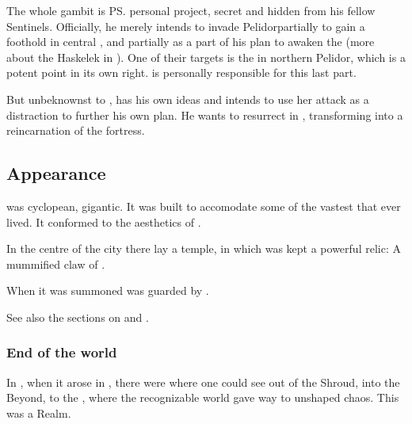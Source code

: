 The whole \Nithdornazsh{} gambit is \ps{\HriistD}{} personal project, secret and hidden from his fellow Sentinels. 
Officially, he merely intends to invade Pelidor\dash partially to gain a foothold in central \Velcad{}, and partially as a part of his plan to awaken the \Haskelek{} (more about the Haskelek in \CarzainWithRedcorBook). 
One of their targets is the  in northern Pelidor, which is a potent \nexus{} point in its own right. 
\Nzessuacrith{} is personally responsible for this last part. 

But unbeknownst to \Nzessuacrith, \HriistD{} has his own ideas and intends to use her attack as a distraction to further his own plan. He wants to resurrect \Nithdornazsh{} in \Malcur, transforming \Malcur into a reincarnation of the \draconic{} fortress. 









\subsection{Appearance}
\Nithdornazsh{} was cyclopean, gigantic. 
It was built to accomodate some of the vastest \dragons{} that ever lived. 
It conformed to the aesthetics of . 

In the centre of the city there lay a temple, in which was kept a powerful relic: 
A mummified claw of \TyarithXserasshana. 

When it was summoned \Nithdornazsh{} was guarded by . 

See also the sections on  and . 





\subsubsection{End of the world}
In \Nithdornazsh, when it arose in \Malcur, there were  where one could see out of the Shroud, into the Beyond, to the , where the recognizable world gave way to unshaped chaos.
This was a  Realm. 


